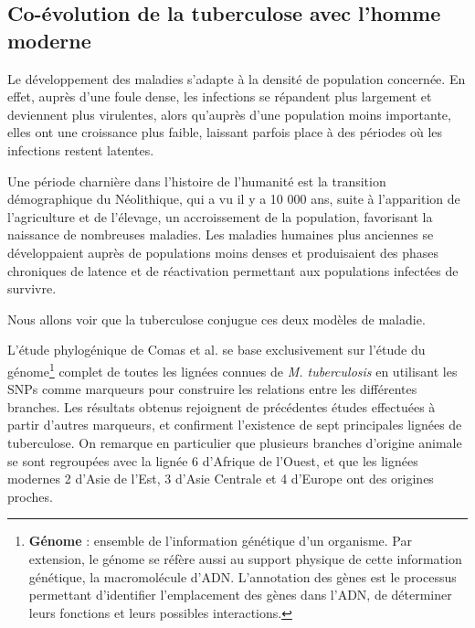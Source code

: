 \documentclass[twoside,a4paper,11pt,frenchb,openany]{report}
\begin{document}

\subsection{Co-évolution de la tuberculose avec l'homme moderne}

Le développement des maladies s'adapte à la densité de population concernée. En effet, auprès d'une foule dense, les infections se répandent plus largement et deviennent plus virulentes, alors qu'auprès d'une population moins importante, elles ont une croissance plus faible, laissant parfois place à des périodes où les infections restent latentes.

Une période charnière dans l'histoire de l'humanité est la transition démographique du Néolithique, qui a vu il y a 10 000 ans, suite à l'apparition de l'agriculture et de l'élevage, un accroissement de la population, favorisant la naissance de nombreuses maladies. Les maladies humaines plus anciennes se développaient auprès de populations moins denses et produisaient des phases chroniques de latence et de réactivation permettant aux populations infectées de survivre.

Nous allons voir que la tuberculose conjugue ces deux modèles de maladie.


L'étude phylogénique de Comas et al.\cite{comas} se base exclusivement sur l'étude du génome\footnote{\textbf{Génome} : ensemble de l'information génétique d'un organisme. Par extension, le génome se réfère aussi au support physique de cette information génétique, la macromolécule d'ADN. L'annotation des gènes est le processus permettant d'identifier l'emplacement des gènes dans l'ADN, de déterminer leurs fonctions et leurs possibles interactions.} complet de toutes les lignées connues de \textit{M. tuberculosis} en utilisant les SNPs comme marqueurs pour construire les relations entre les différentes branches. Les résultats obtenus rejoignent de précédentes études effectuées à partir d'autres marqueurs, et confirment l'existence de sept principales lignées de tuberculose. On remarque en particulier que plusieurs branches d'origine animale se sont regroupées avec la lignée 6 d'Afrique de l'Ouest, et que les lignées modernes 2 d'Asie de l'Est, 3 d'Asie Centrale et 4 d'Europe ont des origines proches. 

\end{document}
